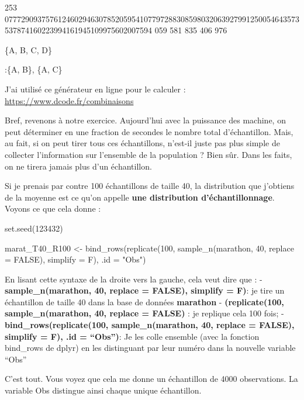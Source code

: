 \documentclass[
]{article}
\newenvironment{Shaded}{\begin{snugshade}}{\end{snugshade}}
\newcommand{\AttributeTok}[1]{\textcolor[rgb]{0.77,0.63,0.00}{#1}}
\newcommand{\ConstantTok}[1]{\textcolor[rgb]{0.00,0.00,0.00}{#1}}
\newcommand{\DecValTok}[1]{\textcolor[rgb]{0.00,0.00,0.81}{#1}}
\newcommand{\FunctionTok}[1]{\textcolor[rgb]{0.00,0.00,0.00}{#1}}
\newcommand{\NormalTok}[1]{#1}
\newcommand{\OtherTok}[1]{\textcolor[rgb]{0.56,0.35,0.01}{#1}}
\newcommand{\StringTok}[1]{\textcolor[rgb]{0.31,0.60,0.02}{#1}}
\begin{document}
253
077729093757612460294630785205954107797288308598032063927991250054643573537874160223994161945109975602007594
059 581 835 406 976

\{A, B, C, D\}

:\{A, B\}, \{A, C\}

J'ai utilisé ce générateur en ligne pour le calculer :
\url{https://www.dcode.fr/combinaisons}

Bref, revenons à notre exercice. Aujourd'hui avec la puissance des
machine, on peut déterminer en une fraction de secondes le nombre total
d'échantillon. Mais, au fait, si on peut tirer tous ces échantillons,
n'est-il juste pas plus simple de collecter l'information sur l'ensemble
de la population ? Bien sûr. Dans les faits, on ne tirera jamais plus
d'un échantillon.

Si je prenais par contre 100 échantillons de taille 40, la distribution
que j'obtiens de la moyenne est ce qu'on appelle \textbf{une
distribution d'échantillonnage}. Voyons ce que cela donne :

\begin{Shaded}
\begin{Highlighting}[]
\FunctionTok{set.seed}\NormalTok{(}\DecValTok{123432}\NormalTok{)}

\NormalTok{marat\_T40\_R100 }\OtherTok{\textless{}{-}} \FunctionTok{bind\_rows}\NormalTok{(}\FunctionTok{replicate}\NormalTok{(}\DecValTok{100}\NormalTok{, }\FunctionTok{sample\_n}\NormalTok{(marathon, }\DecValTok{40}\NormalTok{, }\AttributeTok{replace =} \ConstantTok{FALSE}\NormalTok{), }\AttributeTok{simplify =}\NormalTok{ F), }\AttributeTok{.id =} \StringTok{"Obs"}\NormalTok{)}
\end{Highlighting}
\end{Shaded}

En lisant cette syntaxe de la droite vers la gauche, cela veut dire que
: - \textbf{sample\_n(marathon, 40, replace = FALSE), simplify = F)}: je
tire un échantillon de taille 40 dans la base de données
\textbf{marathon} - \textbf{(replicate(100, sample\_n(marathon, 40,
replace = FALSE)} : je replique cela 100 fois; -
\textbf{bind\_rows(replicate(100, sample\_n(marathon, 40, replace =
FALSE), simplify = F), .id = ``Obs'')}: Je les colle ensemble (avec la
fonction bind\_rows de dplyr) en les distinguant par leur numéro dans la
nouvelle variable ``Obs''

C'est tout. Vous voyez que cela me donne un échantillon de 4000
observations. La variable Obs distingue ainsi chaque unique échantillon.
\end{document}
